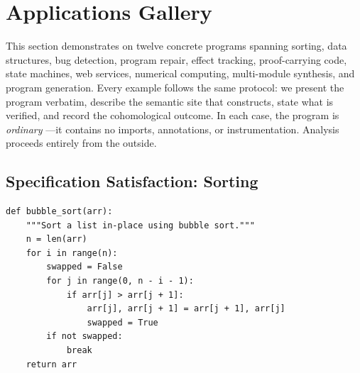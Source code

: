 
\section{Applications Gallery}\label{sec:applications}

This section demonstrates \JuGeo{} on twelve concrete programs spanning
sorting, data structures, bug detection, program repair, effect
tracking, proof-carrying code, state machines, web services, numerical
computing, multi-module synthesis, and program generation.  Every
example follows the same protocol: we present the program verbatim,
describe the semantic site that \JuGeo{} constructs, state what is
verified, and record the cohomological outcome.  In each case, the
program is \emph{ordinary \Python{}}---it contains no \JuGeo{} imports,
annotations, or instrumentation.  Analysis proceeds entirely from the
outside.


\subsection{Specification Satisfaction: Sorting}\label{sec:app-sort}

\begin{lstlisting}[style=jugeo-python,caption={Bubble sort.},label={lst:bubblesort}]
def bubble_sort(arr):
    """Sort a list in-place using bubble sort."""
    n = len(arr)
    for i in range(n):
        swapped = False
        for j in range(0, n - i - 1):
            if arr[j] > arr[j + 1]:
                arr[j], arr[j + 1] = arr[j + 1], arr[j]
                swapped = True
        if not swapped:
            break
    return arr
\end{lstlisting}

